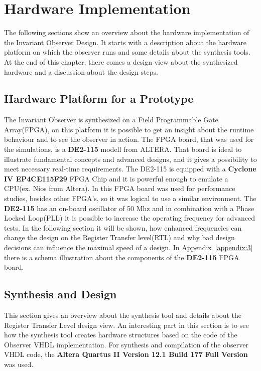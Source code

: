 \chapter{Hardware Implementation}

\ifpdf
    \graphicspath{{Chapter3/Figs/Raster/}{Chapter3/Figs/PDF/}{Chapter3/Figs/}}
\else
    \graphicspath{{Chapter3/Figs/Vector/}{Chapter3/Figs/}}
\fi


The following sections show an overview about the hardware implementation of the Invariant Observer Design. 
It starts with a description about the hardware platform on which the observer runs and some details
about the synthesis tools. 
At the end of this chapter, there comes a design view about the synthesized hardware and a discussion about 
the design steps. 
\section{Hardware Platform for a Prototype}
The Invariant Observer is synthesized on a Field Programmable Gate Array(FPGA), on this platform it is possible to get an insight
about the runtime behaviour and to see the observer in action. 
The FPGA board, that was used for the simulations, is a \textbf{DE2-115} modell from ALTERA\cite{altera1}. 
That board is ideal to illustrate fundamental concepts and advanced designs, and it gives a possibility
to meet necessary real-time requirements. The DE2-115 is equipped with a \textbf{Cyclone IV EP4CE115F29} 
FPGA Chip and it is powerful enough to emulate a CPU(ex. Nios from Altera). In \cite{RTFMBJ13} this FPGA board was used for performance studies, besides other FPGA's,
so it was logical to use a similar environment. 
The \textbf{DE2-115} has an on-board oscillator of 50 Mhz and in combination with a Phase Locked Loop(PLL) it is possible to increase the operating frequency for advanced tests. 
In the following section it will be shown, how enhanced frequencies can change the design on the Register Transfer level(RTL) and why bad design decisions 
can influence the maximal speed of a design. In Appendix~\ref{appendix:3} there is a schema illustration about the components of the \textbf{DE2-115} FPGA board. 


\section{Synthesis and Design}
This section gives an overview about the synthesis tool and details about the Register Transfer Level design view. 
An interesting part in this section is to see how the synthesis tool creates hardware structures based on the code of the
Observer VHDL implementation. \newline
For synthesis and compilation of the observer VHDL code, the \textbf{Altera Quartus II Version 12.1 Build 177 Full Version} was used. 
